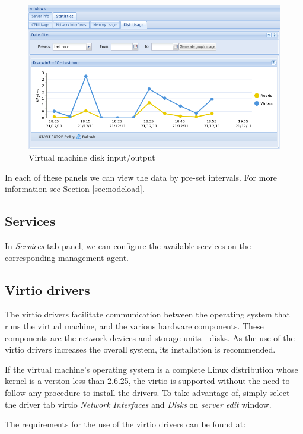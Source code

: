\begin{figure}[H]
	\begin{center}
	\includegraphics[scale=0.45]{screenshots/vm_disk_io.png}
	\caption{Virtual machine disk input/output}
	\label{fig:vm_disk_io}
	\end{center}
\end{figure}

In each of these panels we can view the data by pre-set intervals. For more information see Section \ref{sec:nodeload}.

\subsection{Services}
In \emph{Services} tab panel, we can configure the available services on the corresponding management agent.

\subsection{Virtio drivers}
The virtio drivers facilitate communication between the operating system that runs the virtual machine, and the various hardware components. These components are the network devices and storage units - disks. As the use of the virtio drivers increases the overall system, its installation is recommended.

If the virtual machine's operating system is a complete Linux distribution whose kernel is a version less than 2.6.25, the virtio is supported without the need to follow any procedure to install the drivers. To take advantage of, simply select the driver tab virtio \textit{Network Interfaces} and \textit{Disks} on \textit{server edit} window.

The requirements for the use of the virtio drivers can be found at:

